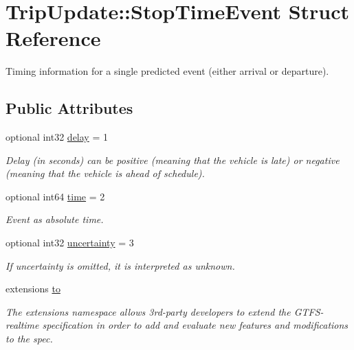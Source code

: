 \hypertarget{structTripUpdate_1_1StopTimeEvent}{}\section{Trip\+Update\+:\+:Stop\+Time\+Event Struct Reference}
\label{structTripUpdate_1_1StopTimeEvent}


Timing information for a single predicted event (either arrival or departure).  


\subsection*{Public Attributes}
\begin{DoxyCompactItemize}
\item 
optional int32 \hyperlink{structTripUpdate_1_1StopTimeEvent_afe99bf7417c3476bab4bfef2de42031e}{delay} = 1
\begin{DoxyCompactList}\small\item\em Delay (in seconds) can be positive (meaning that the vehicle is late) or negative (meaning that the vehicle is ahead of schedule). \end{DoxyCompactList}\item 
optional int64 \hyperlink{structTripUpdate_1_1StopTimeEvent_ad4b60263cd802942cfe9ecb5575a43e1}{time} = 2
\begin{DoxyCompactList}\small\item\em Event as absolute time. \end{DoxyCompactList}\item 
optional int32 \hyperlink{structTripUpdate_1_1StopTimeEvent_aa5a428ea725519680c1b1b1b23d7c454}{uncertainty} = 3
\begin{DoxyCompactList}\small\item\em If uncertainty is omitted, it is interpreted as unknown. \end{DoxyCompactList}\item 
extensions \hyperlink{structTripUpdate_1_1StopTimeEvent_a8ec3aa808c676e498daef61b967f7dd3}{to}
\begin{DoxyCompactList}\small\item\em The extensions namespace allows 3rd-\/party developers to extend the G\+T\+F\+S-\/realtime specification in order to add and evaluate new features and modifications to the spec. \end{DoxyCompactList}\end{DoxyCompactItemize}


